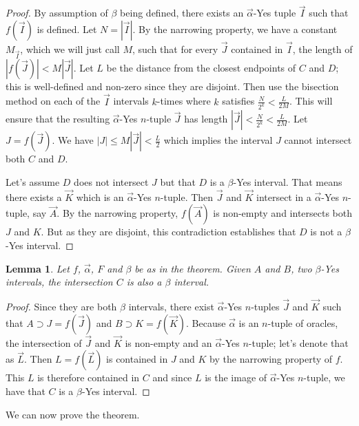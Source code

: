 \documentclass[12pt]{article}
\newtheorem{lemma}{Lemma}
\theoremstyle{remark}
\begin{document}
\begin{proof}
By assumption of $\beta$ being defined, there exists an $\vec{\alpha}$-Yes tuple $\vec{I}$ such that $f(\vec{I})$ is defined. Let $N =|\vec{I}|$. By the narrowing property, we have a constant $M_{\vec{I}}$, which we will just call $M$, such that for every $\vec{J}$ contained in $\vec{I}$, the length of $|f(\vec{J})| < M |\vec{J}|$. Let $L$ be the distance from the closest endpoints of $C$ and $D$; this is well-defined and non-zero since they are disjoint. Then use the bisection method on each of the $\vec{I}$ intervals $k$-times where $k$ satisfies $\frac{N}{2^k} < \frac{L}{2M}$. This will ensure that the resulting $\vec{\alpha}$-Yes $n$-tuple $\vec{J}$ has length $|\vec{J}| < \frac{N}{2^{k}} < \frac{L}{2M}$. Let $J = f(\vec{J})$. We have $|J| \leq M |\vec{J}| < \frac{L}{2}$ which implies the interval $J$ cannot intersect both $C$ and $D$. 

Let's assume $D$ does not intersect $J$ but that $D$ is a $\beta$-Yes interval. That means there exists a $\vec{K}$ which is an $\vec{\alpha}$-Yes $n$-tuple. Then $\vec{J}$ and $\vec{K}$ intersect in a $\vec{\alpha}$-Yes $n$-tuple, say $\vec{A}$. By the narrowing property, $f(\vec{A})$ is non-empty and intersects both $J$ and $K$. But as they are disjoint, this contradiction establishes that $D$ is not a $\beta$-Yes interval. 
\end{proof}

\begin{lemma}
Let $f$, $\vec{\alpha}$, $F$ and $\beta$ be as in the theorem. Given $A$ and $B$, two $\beta$-Yes intervals, the intersection $C$ is also a $\beta$ interval. 
\end{lemma}

\begin{proof}
Since they are both $\beta$ intervals, there exist $\vec{\alpha}$-Yes $n$-tuples $\vec{J}$ and $\vec{K}$ such that $A \supset J = f(\vec{J})$ and $B \supset K= f(\vec{K})$. Because $\vec{\alpha}$ is an $n$-tuple of oracles, the intersection of $\vec{J}$ and $\vec{K}$ is non-empty and an $\vec{\alpha}$-Yes $n$-tuple; let's denote that as $\vec{L}$. Then $L = f(\vec{L})$ is contained in $J$ and $K$ by the narrowing property of $f$. This $L$ is therefore contained in $C$ and since $L$ is the image of $\vec{\alpha}$-Yes $n$-tuple, we have that $C$ is a $\beta$-Yes interval. 
\end{proof}

We can now prove the theorem. 
\end{document}
